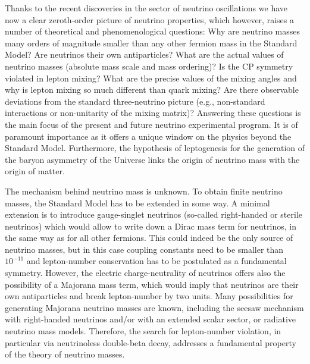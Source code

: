 


Thanks to the recent discoveries in the sector of neutrino oscillations
 we have now a clear zeroth-order picture of neutrino properties, which however, raises a number of theoretical and phenomenological questions: Why are neutrino masses many orders of magnitude smaller than any other fermion mass in the Standard Model? Are neutrinos their own antiparticles? What are the actual values of neutrino masses (absolute mass scale and mass ordering)? Is the CP symmetry violated in lepton mixing? What are the precise values of the mixing angles and why is lepton mixing so much different than quark mixing? Are there observable deviations from the standard three-neutrino picture (e.g., non-standard interactions or non-unitarity of the mixing matrix)? 
Answering these questions is the main focus of the present and future neutrino experimental program. It is of paramount importance as it offers a unique window on the physics beyond the Standard Model. Furthermore, the hypothesis of leptogenesis for the generation of the baryon asymmetry of the Universe links the origin of neutrino mass with the origin of matter.

The mechanism behind neutrino mass is unknown. 
To obtain finite neutrino masses, the Standard Model has to be extended in some way.
A minimal extension is to introduce gauge-singlet neutrinos (so-called right-handed or sterile neutrinos) which would allow to write down a Dirac mass term for neutrinos, in the same way as for all other fermions. This could indeed be the only source of neutrino masses, but in this case coupling constants need to be smaller than $10^{-11}$ and lepton-number conservation has to be postulated as a fundamental symmetry. However, the electric charge-neutrality of neutrinos offers also the possibility of a Majorana mass term, which would imply that neutrinos are their own antiparticles and break lepton-number by two units. Many possibilities for generating Majorana neutrino masses are known, including the seesaw mechanism with right-handed neutrinos and/or with an extended scalar sector, or radiative neutrino mass models. Therefore, the search for lepton-number violation, in particular via neutrinoless double-beta decay, addresses a fundamental property of the theory of neutrino masses. 

